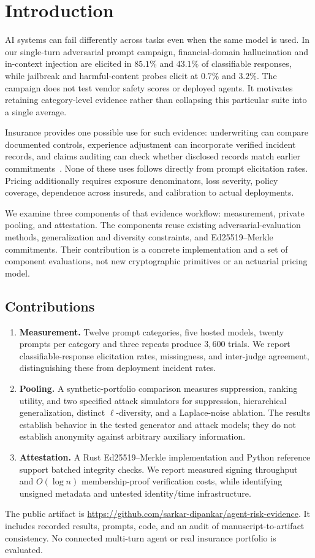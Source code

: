 \section{Introduction}
\label{sec:introduction}
AI systems can fail differently across tasks even when the same model is used. In our single-turn adversarial prompt campaign, financial-domain hallucination and in-context injection are elicited in $85.1\%$ and $43.1\%$ of classifiable responses, while jailbreak and harmful-content probes elicit at $0.7\%$ and $3.2\%$. The campaign does not test vendor safety scores or deployed agents. It motivates retaining category-level evidence rather than collapsing this particular suite into a single average.

Insurance provides one possible use for such evidence: underwriting can compare documented controls, experience adjustment can incorporate verified incident records, and claims auditing can check whether disclosed records match earlier commitments~\cite{romanosky_2019_content,eling_2016_cyberrisk}. None of these uses follows directly from prompt elicitation rates. Pricing additionally requires exposure denominators, loss severity, policy coverage, dependence across insureds, and calibration to actual deployments.

We examine three components of that evidence workflow: measurement, private pooling, and attestation. The components reuse existing adversarial-evaluation methods, generalization and diversity constraints, and Ed25519--Merkle commitments. Their contribution is a concrete implementation and a set of component evaluations, not new cryptographic primitives or an actuarial pricing model.

\subsection{Contributions}
\begin{enumerate}
\item \textbf{Measurement.} Twelve prompt categories, five hosted models, twenty prompts per category and three repeats produce $3{,}600$ trials. We report classifiable-response elicitation rates, missingness, and inter-judge agreement, distinguishing these from deployment incident rates.
\item \textbf{Pooling.} A synthetic-portfolio comparison measures suppression, ranking utility, and two specified attack simulators for suppression, hierarchical generalization, distinct $\ell$-diversity, and a Laplace-noise ablation. The results establish behavior in the tested generator and attack models; they do not establish anonymity against arbitrary auxiliary information.
\item \textbf{Attestation.} A Rust Ed25519--Merkle implementation and Python reference support batched integrity checks. We report measured signing throughput and $O(\log n)$ membership-proof verification costs, while identifying unsigned metadata and untested identity/time infrastructure.
\end{enumerate}

The public artifact is \url{https://github.com/sarkar-dipankar/agent-risk-evidence}. It includes recorded results, prompts, code, and an audit of manuscript-to-artifact consistency. No connected multi-turn agent or real insurance portfolio is evaluated.
